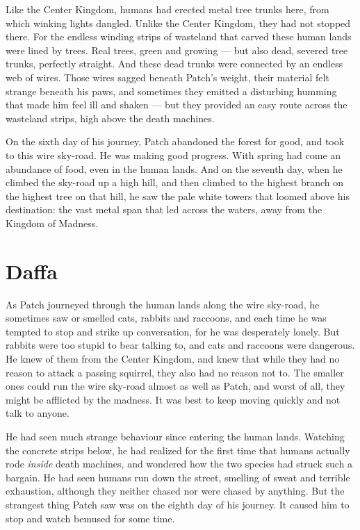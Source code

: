 \documentclass[ebook,oneside,openany,12pt]{memoir}
\begin{document}
Like the Center Kingdom, humans had erected metal tree trunks here,
from which winking lights dangled. Unlike the Center Kingdom, they had
not stopped there. For the endless winding strips of wasteland that
carved these human lands were lined by trees. Real trees, green and
growing — but also dead, severed tree trunks, perfectly straight. And
these dead trunks were connected by an endless web of wires. Those
wires sagged beneath Patch’s weight, their material felt strange
beneath his paws, and sometimes they emitted a disturbing humming that
made him feel ill and shaken — but they provided an easy route across
the wasteland strips, high above the death machines.

On the sixth day of his journey, Patch abandoned the forest for good,
and took to this wire sky-road. He was making good progress. With
spring had come an abundance of food, even in the human lands. And on
the seventh day, when he climbed the sky-road up a high hill, and then
climbed to the highest branch on the highest tree on that hill, he saw
the pale white towers that loomed above his destination: the vast
metal span that led across the waters, away from the Kingdom of
Madness.


\section{Daffa}

As Patch journeyed through the human lands along the wire sky-road, he
sometimes saw or smelled cats, rabbits and raccoons, and each time he
was tempted to stop and strike up conversation, for he was desperately
lonely. But rabbits were too stupid to bear talking to, and cats and
raccoons were dangerous. He knew of them from the Center Kingdom, and
knew that while they had no reason to attack a passing squirrel, they
also had no reason not to. The smaller ones could run the wire
sky-road almost as well as Patch, and worst of all, they might be
afflicted by the madness. It was best to keep moving quickly and not
talk to anyone.

He had seen much strange behaviour since entering the human
lands. Watching the concrete strips below, he had realized for the
first time that humans actually rode \emph{inside} death machines,
and wondered how the two species had struck such a bargain. He had
seen humans run down the street, smelling of sweat and terrible
exhaustion, although they neither chased nor were chased by
anything. But the strangest thing Patch saw was on the eighth day of
his journey. It caused him to stop and watch bemused for some time.
\end{document}
